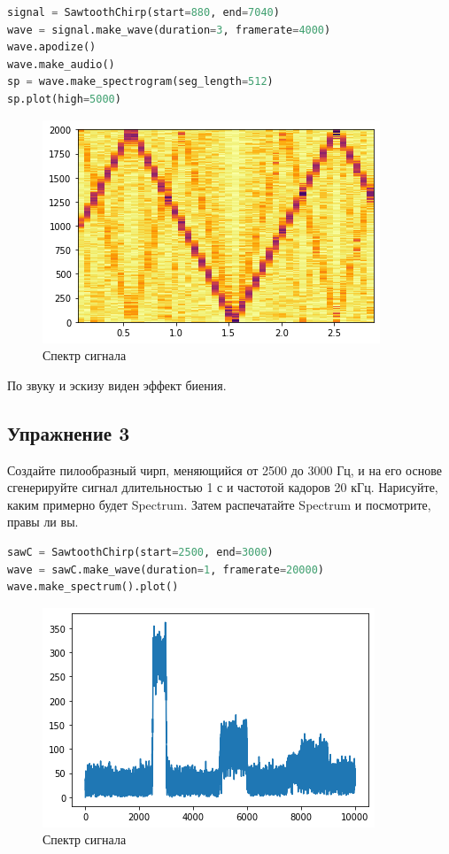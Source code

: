 \begin{lstlisting}[language=Python]
signal = SawtoothChirp(start=880, end=7040)
wave = signal.make_wave(duration=3, framerate=4000)
wave.apodize()
wave.make_audio()
sp = wave.make_spectrogram(seg_length=512)
sp.plot(high=5000)
\end{lstlisting}

\begin{figure}[H]
	\begin{center}
		\includegraphics[scale=1]{fig/lab03/lab03_4.png}
		\caption{Спектр сигнала}
	\end{center}
\end{figure}

По звуку и эскизу виден эффект биения.


\subsection{Упражнение 3}

Создайте пилообразный чирп, меняющийся от 2500 до 3000 Гц, и на его основе сгенерируйте сигнал длительностью 1 с и частотой кадоров 20 кГц. Нарисуйте, каким примерно будет Spectrum. Затем распечатайте Spectrum и посмотрите, правы ли вы.

\begin{lstlisting}[language=Python]
sawC = SawtoothChirp(start=2500, end=3000)
wave = sawC.make_wave(duration=1, framerate=20000)
wave.make_spectrum().plot()
\end{lstlisting}
\begin{figure}[H]
	\begin{center}
		\includegraphics[scale=1]{fig/lab03/lab03_5.png}
		\caption{Спектр сигнала}
	\end{center}
\end{figure}

